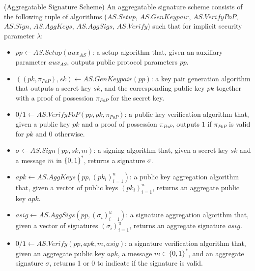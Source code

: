 \begin{definition}
\label{def:aggregate_signatures}
(Aggregatable Signature Scheme) An aggregatable signature scheme consists of
the following tuple of algorithms ($\mathit{AS.Setup}$, $\mathit{AS.GenKeypair}$, $\mathit{AS.VerifyPoP}$, 
$\mathit{AS.Sign}$, $\mathit{AS.AggKeys}$, $\mathit{AS.AggSigs}$, $\mathit{AS.Verify}$) 
such that for implicit security parameter $\lambda$:
\begin{itemize}

\item $\mathit{pp} \leftarrow  \mathit{AS.Setup}(\mathit{aux_{\mathit{AS}}})$: a setup algorithm that, given an 
auxiliary parameter $\mathit{aux_{\mathit{AS}}}$, outputs public protocol parameters $\mathit{pp}$. 

\item $((\mathit{pk},\mathit{\pi_{PoP}}),\mathit{sk}) \leftarrow \mathit{AS.GenKeypair}(\mathit{pp})$:
a key pair generation algorithm that
outputs
a secret key $\mathit{sk}$,
and the corresponding public key $\mathit{pk}$
together with a proof of possession $\mathit{\pi_{PoP}}$ for the secret key.

\item $0/1 \leftarrow \mathit{AS.VerifyPoP}(\mathit{pp}, \mathit{pk},\mathit{\pi_{PoP}})$:
a public key verification algorithm that,
given a public key $\mathit{pk}$
and a proof of possession $\mathit{\pi_{PoP}}$,
outputs
$1$ if $\mathit{\pi_{PoP}}$ is valid for $\mathit{pk}$ and $0$ otherwise.

\item $\sigma \leftarrow \mathit{AS.Sign}(\mathit{pp}, \mathit{sk}, m)$:
a signing algorithm that,
given a secret key $\mathit{sk}$ and a message $m$ in $\{0, 1\}^*$, returns a signature $\sigma$.

\item $\mathit{apk} \leftarrow \mathit{AS.AggKeys}(\mathit{pp}, (\mathit{pk_i})_{i=1}^{u})$:
a public key aggregation algorithm that,
given a vector of public keys $(\mathit{pk_i})_{i=1}^u$,
returns
an aggregate public key $\mathit{apk}$.

\item $\mathit{asig} \leftarrow \mathit{AS.AggSigs}(\mathit{pp}, (\sigma_i)_{i=1}^u)$:
a signature aggregation algorithm that,
given a vector of signatures $(\sigma_i)_{i=1}^u$,
returns
an aggregate signature $\mathit{asig}$.

\item $0/1 \leftarrow \mathit{AS.Verify}(\mathit{pp}, \mathit{apk}, m, \mathit{asig})$:
a signature verification algorithm that,
given an aggregate public key $\mathit{apk}$, a message $m \in \{0, 1\}^*$, and an aggregate signature $\sigma$,
returns
1 or 0 to indicate if the signature is valid.
\end{itemize}


\end{definition}
